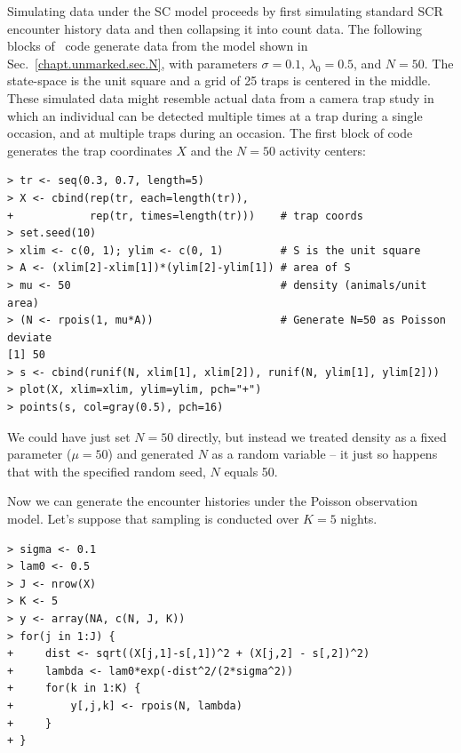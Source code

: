Simulating data under the SC model proceeds by first simulating
standard SCR encounter history data and then collapsing it into count
data. The following blocks of \R~code generate data from
the model shown in Sec.~\ref{chapt.unmarked.sec.N}, with parameters
$\sigma=0.1$, $\lambda_0=0.5$, and $N=50$. The state-space is the unit
square and a grid of 25 traps
is centered in the middle. These simulated data might resemble actual
data from a camera trap study in which an individual can be detected multiple
times at a trap during a single occasion, and at multiple traps during
an occasion. The first block of code generates the trap coordinates
$X$ and the $N=50$ activity centers:
\begin{verbatim}
> tr <- seq(0.3, 0.7, length=5)
> X <- cbind(rep(tr, each=length(tr)),
+            rep(tr, times=length(tr)))    # trap coords
> set.seed(10)
> xlim <- c(0, 1); ylim <- c(0, 1)         # S is the unit square
> A <- (xlim[2]-xlim[1])*(ylim[2]-ylim[1]) # area of S
> mu <- 50                                 # density (animals/unit area)
> (N <- rpois(1, mu*A))                    # Generate N=50 as Poisson deviate
[1] 50
> s <- cbind(runif(N, xlim[1], xlim[2]), runif(N, ylim[1], ylim[2]))
> plot(X, xlim=xlim, ylim=ylim, pch="+")
> points(s, col=gray(0.5), pch=16)
\end{verbatim}
We could have just set $N=50$ directly, but instead we treated density
as a fixed parameter ($\mu=50$) and generated $N$ as a random
variable -- it just so happens that with the specified random seed,
$N$ equals 50.

Now we can generate the encounter histories under the
Poisson observation model. Let's suppose that sampling is conducted
over $K=5$ nights.
\begin{verbatim}
> sigma <- 0.1
> lam0 <- 0.5
> J <- nrow(X)
> K <- 5
> y <- array(NA, c(N, J, K))
> for(j in 1:J) {
+     dist <- sqrt((X[j,1]-s[,1])^2 + (X[j,2] - s[,2])^2)
+     lambda <- lam0*exp(-dist^2/(2*sigma^2))
+     for(k in 1:K) {
+         y[,j,k] <- rpois(N, lambda)
+     }
+ }
\end{verbatim}

